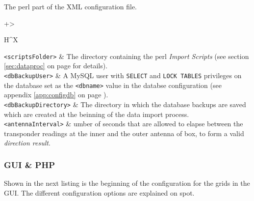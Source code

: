 \documentclass[a4paper,10pt,twoside,titlepage,headings=small,bibliography=totocnumbered,headsepline]{scrartcl}
\begin{document}
\begin{appendix}
The perl part of the XML configuration file.



\begin{center} 
\begin{tabularx}{\textwidth}{+>{\raggedright\arraybackslash}H^X}
\toprule
\lstinline|<scriptsFolder>|	&	The directory containing the perl \textit{Import Scripts} (see section \ref{sec:dataproc} on page \pageref{sec:dataproc} for details). \\\midrule
\lstinline|<dbBackupUser>|	&	A MySQL user with \lstinline|SELECT| and \lstinline|LOCK TABLES| privileges on the database set as the \lstinline|<dbname>| value in the databse configuration (see appendix \ref{app:configdb} on page \pageref{app:configdb}). \\\midrule
\lstinline|<dbBackupDirectory>|	&	The directory in which the database backups are saved which are created at the beinning of the data import process. \\\midrule
\lstinline|<antennaInterval>|	&	 umber of seconds that are allowed to elapse between the transponder readings at the inner and the outer antenna of box, to form a valid \textit{direction result}.\\\midrule
\end{tabularx}
\label{tab:perl_config}
\end{center} 

\subsubsection{GUI \& PHP}
\label{app:configfrontend}




Shown in the next listing is the beginning of the configuration for the grids in the GUI. The different configuration options are explained on spot.




\end{appendix}
\end{document}
